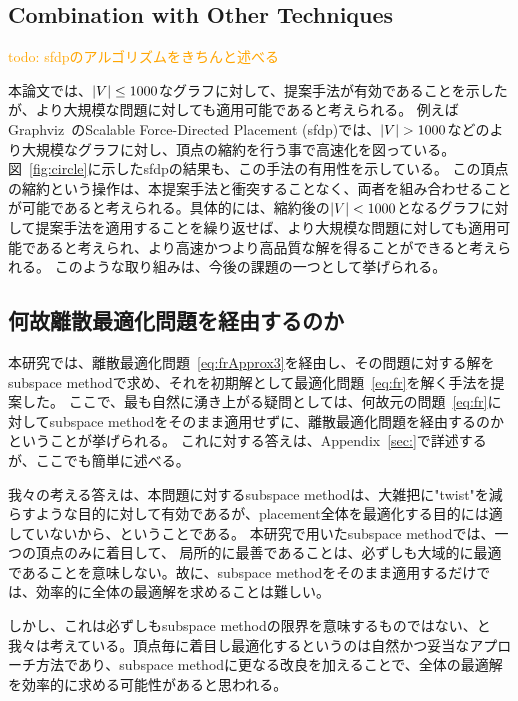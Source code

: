 \documentclass[dvipdfmx,lettersize,journal]{IEEEtran}
\newcommand{\orange}[1]{\textcolor{orange}{#1}}
\begin{document}
\subsection{Combination with Other Techniques}\label{sec:combination}

\orange{todo: sfdpのアルゴリズムをきちんと述べる}

本論文では、$\abs{V} \leq 1000$なグラフに対して、提案手法が有効であることを示したが、より大規模な問題に対しても適用可能であると考えられる。
例えばGraphviz~\cite{ellsonGraphvizOpenSourceGraph2002}のScalable Force-Directed Placement (sfdp)では、$\abs{V}>1000$などのより大規模なグラフに対し、頂点の縮約を行う事で高速化を図っている。図~\ref{fig:circle}に示したsfdpの結果も、この手法の有用性を示している。
この頂点の縮約という操作は、本提案手法と衝突することなく、両者を組み合わせることが可能であると考えられる。具体的には、縮約後の$\abs{V}<1000$となるグラフに対して提案手法を適用することを繰り返せば、より大規模な問題に対しても適用可能であると考えられ、より高速かつより高品質な解を得ることができると考えられる。
このような取り組みは、今後の課題の一つとして挙げられる。

\subsection{何故離散最適化問題を経由するのか}\label{sec:whyDiscrete}

本研究では、離散最適化問題~\eqref{eq:frApprox3}を経由し、その問題に対する解をsubspace methodで求め、それを初期解として最適化問題~\eqref{eq:fr}を解く手法を提案した。
ここで、最も自然に湧き上がる疑問としては、何故元の問題~\eqref{eq:fr}に対してsubspace methodをそのまま適用せずに、離散最適化問題を経由するのかということが挙げられる。
これに対する答えは、Appendix~\ref{sec:}で詳述するが、ここでも簡単に述べる。

我々の考える答えは、本問題に対するsubspace methodは、大雑把に"twist"を減らすような目的に対して有効であるが、placement全体を最適化する目的には適していないから、ということである。
本研究で用いたsubspace methodでは、一つの頂点のみに着目して、
局所的に最善であることは、必ずしも大域的に最適であることを意味しない。故に、subspace methodをそのまま適用するだけでは、効率的に全体の最適解を求めることは難しい。

しかし、これは必ずしもsubspace methodの限界を意味するものではない、と我々は考えている。頂点毎に着目し最適化するというのは自然かつ妥当なアプローチ方法であり、subspace methodに更なる改良を加えることで、全体の最適解を効率的に求める可能性があると思われる。
\end{document}

